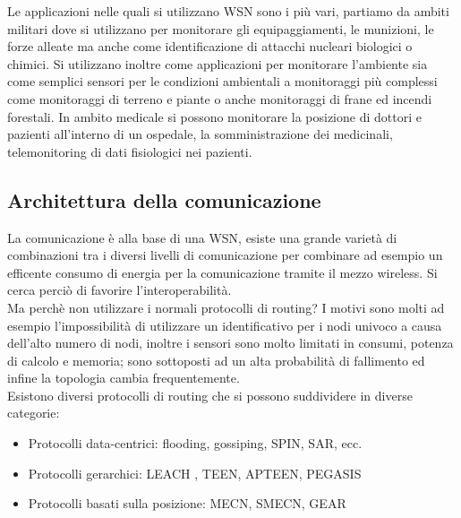 Le applicazioni nelle quali si utilizzano WSN sono i più vari, partiamo da ambiti militari dove si utilizzano per monitorare gli equipaggiamenti, le munizioni, le forze alleate ma anche come identificazione di attacchi nucleari biologici o chimici. Si utilizzano inoltre come applicazioni per monitorare l'ambiente sia come semplici sensori per le condizioni ambientali a monitoraggi più complessi come monitoraggi di terreno e piante o anche monitoraggi di frane ed incendi forestali. In ambito medicale si possono monitorare la posizione di dottori e pazienti all'interno di un ospedale, la somministrazione dei medicinali, telemonitoring di dati fisiologici nei pazienti.
\subsection{Architettura della comunicazione}
La comunicazione è alla base di una WSN, esiste una grande varietà di combinazioni tra i diversi livelli di comunicazione per combinare ad esempio un efficente consumo di energia per la comunicazione tramite il mezzo wireless. Si cerca perciò di favorire l'interoperabilità.\\
Ma perchè non utilizzare i normali protocolli di routing? I motivi sono molti ad esempio l'impossibilità di utilizzare un identificativo per i nodi univoco a causa dell'alto numero di nodi, inoltre i sensori sono molto limitati in consumi, potenza di calcolo e memoria; sono sottoposti ad un alta probabilità di fallimento ed infine la topologia cambia frequentemente.\\
Esistono diversi protocolli di routing che si possono suddividere in diverse categorie:
\begin{itemize}
	\item Protocolli data-centrici: flooding, gossiping, SPIN, SAR, ecc.
	\item Protocolli gerarchici: LEACH , TEEN, APTEEN, PEGASIS
	\item Protocolli basati sulla posizione: MECN, SMECN, GEAR
\end{itemize}
